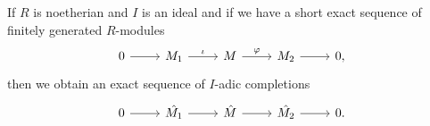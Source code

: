 If $R$ is noetherian and $I$ is an ideal and if we have a short exact sequence
of finitely generated $R$-modules
\[\begin{tikzcd}
	0\ar[r] & M_1\ar[r, "\iota"] & M\ar[r, "\varphi"] & M_2\ar[r] & 0,
\end{tikzcd}\]
then we obtain an exact sequence of $I$-adic completions
\[\begin{tikzcd}
	0\ar[r] & \hat{M_1}\ar[r] & \hat{M}\ar[r] & \hat{M_2}\ar[r] & 0.
\end{tikzcd}\]
